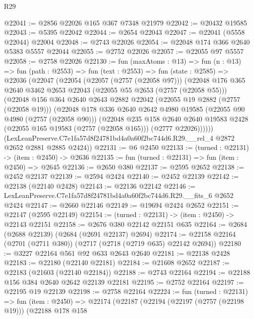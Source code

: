\begin{lexlean}{R29}
\begin{coremodule}
@22041 := @2856 @22026 @165 @367 @7348 @21979
@22042 := @20432 @19585
@22043 := @5395 @22042
@22044 := @2654 @22043
@22047 := @22041 (@5558 @22044) @22004
@22048 := @2743 @22026
@22054 := @22048 @174 @366 @2640 @5383 @5557 @22044
@22055 := @2752 @22026
@22057 := @22055 @97 @5557
@22058 := @2758 @22026
@22130 := fun (maxAtoms : @13) =>
  fun (n : @13) =>
  fun (path : @2553) =>
  fun (text : @2553) =>
  fun (state : @2585) =>
  @22036
    (@22047
      (@22054
        (@22057 (@2757 (@22058 @97)))
        (@22048
          @176
          @365
          @2640
          @3462
          @2653
          @22043
          (@22055 @55 @2653 (@2757 (@22058 @55)))
          (@22048
            @156
            @364
            @2640
            @2643
            @2882
            @22042
            (@22055 @19 @2882 (@2757 (@22058 @19)))
            (@22048
              @178
              @336
              @2640
              @2642
              @4980
              @19585
              (@22055 @90 @4980 (@2757 (@22058 @90)))
              (@22048
                @235
                @158
                @2640
                @2640
                @19583
                @2428
                (@22055 @165 @19583 (@2757 (@22058 @165)))
                (@2777 @22026))))))
      (LexLeanPreserve.C7e1fa57d8f24781bd4a0a60f2bc744d6.R29.__rel_4 @2872 @2652 @2881 @2885 @2424))
@22131 := @6 @2450
@22133 := (turned : @22131) -> (item : @2450) -> @2636
@22135 := fun (turned : @22131) => fun (item : @2450) => @2645
@22136 := @2650 @380
@22137 := @2595 @2652
@22138 := @2452 @22137
@22139 := @2594 @2424
@22140 := @2452 @22139
@22142 := @22138 (@22140 @2428)
@22143 := @22136 @22142
@22146 := LexLeanPreserve.C7e1fa57d8f24781bd4a0a60f2bc744d6.R29.__fits_6 @2652 @2424
@22147 := @2660 @22146
@22149 := @19694 @2424 @2652
@22151 := @22147 (@2595 @22149)
@22154 := (turned : @22131) -> (item : @2450) -> @22143 @22151
@22158 := @2676 @380 @22142 @22151 @635
@22164 := @2684 (@2688 @22139) (@2684 (@2691 @22137) @2694)
@22174 := @22158 @22164 (@2701 (@2711 @380)) (@2717 (@2718 (@2719 @635) @22142 @2694))
@22180 := @3227 @22164 @561 @92 @633 @2643 @2640
@22181 := @22138 @2428
@22183 := @22180 (@22140 @22181)
@22184 := @21608 @2652
@22187 := @22183 (@21603 (@22140 @22184))
@22188 := @2743 @22164
@22194 := @22188 @156 @384 @2640 @2642 @22139 @22181
@22195 := @2752 @22164
@22197 := @22195 @19 @22139
@22198 := @2758 @22164
@22224 := fun (turned : @22131) =>
  fun (item : @2450) =>
  @22174
    (@22187
      (@22194
        (@22197 (@2757 (@22198 @19)))
        (@22188
          @178
          @158

\end{coremodule}
\end{lexlean}

